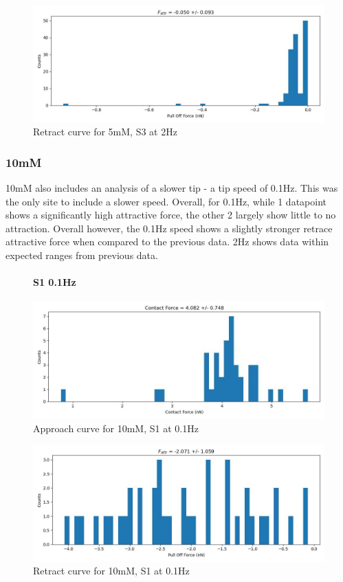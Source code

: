 \begin{figure}[h!]
\centering
\includegraphics[width=\textwidth]{chapter7/Tip speed/5mM/S3 2Hz/retract_f_a_hist.jpg}
\caption{Retract curve for 5mM, S3 at 2Hz}
\end{figure}
\newpage

\subsubsection*{10mM}
10mM also includes an analysis of a slower tip - a tip speed of 0.1Hz. This was the only site to include a slower speed. Overall, for 0.1Hz, while 1 datapoint shows a significantly high attractive force, the other 2 largely show little to no attraction. Overall however, the 0.1Hz speed shows a slightly stronger retrace attractive force when compared to the previous data. 2Hz shows data within expected ranges from previous data.
\begin{figure}[h!]
\paragraph{S1 0.1Hz}
\centering
\includegraphics[width=\textwidth]{chapter7/Tip speed/10mM/S1 0.1Hz/approach_f_c_hist.jpg}
\caption{Approach curve for 10mM, S1 at 0.1Hz}
\end{figure}

\begin{figure}[h!]
\centering
\includegraphics[width=\textwidth]{chapter7/Tip speed/10mM/S1 0.1Hz/retract_f_a_hist.jpg}
\caption{Retract curve for 10mM, S1 at 0.1Hz}
\end{figure}
\newpage

